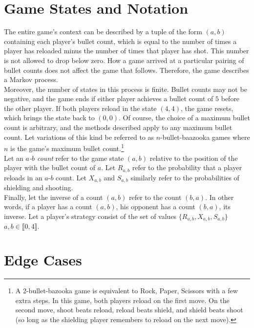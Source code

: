 \documentclass[11pt]{article}
\begin{document}
\begin{multicols}{2}
\section{Game States and Notation}

The entire game's context can be described by a tuple of the form $(a, b)$ containing each player's bullet count, which is equal to the number of times a player has reloaded minus the number of times that player has shot. This number is not allowed to drop below zero. How a game arrived at a particular pairing of bullet counts does not affect the game that follows. Therefore, the game describes a Markov process.
\\

Moreover, the number of states in this process is finite. Bullet counts may not be negative, and the game ends if either player achieves a bullet count of $5$ before the other player. If both players reload in the state $(4, 4)$, the game resets, which brings the state back to $(0, 0)$. Of course, the choice of a maximum bullet count is arbitrary, and the methods described apply to any maximum bullet count. Let variations of this kind be referred to as $n$-bullet-baazooka games where $n$ is the game's maximum bullet count.\footnote{A 2-bullet-bazooka game is equivalent to Rock, Paper, Scissors with a few extra steps. In this game, both players reload on the first move. On the second move, shoot beats reload, reload beats shield, and shield beats shoot (so long as the shielding player remembers to reload on the next move).}
\\

Let an \emph{$a$-$b$ count} refer to the game state $(a, b)$ relative to the position of the player with the bullet count of $a$. Let $R_{a,b}$ refer to the probability that a player reloads in an $a$-$b$ count. Let $X_{a,b}$ and $S_{a,b}$ similarly refer to the probabilities of shielding and shooting.
\\

Finally, let the inverse of a count $(a, b)$ refer to the count $(b, a)$. In other words, if a player has a count $(a, b)$, his opponent has a count $(b, a)$, its inverse. Let a player's strategy consist of the set of values $\{R_{a,b}, X_{a,b}, S_{a,b}\}$ \forall $a, b \in  \llbracket 0, 4 \rrbracket$. 
\\

\section{Edge Cases}


\end{multicols}
\end{document}
